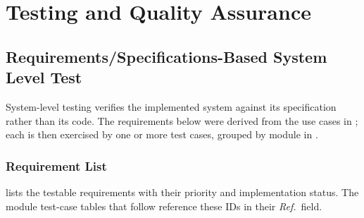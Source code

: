\chapter{Testing and Quality Assurance}\label{ch:test}

\section{Requirements/Specifications-Based System Level Test}

System-level testing verifies the implemented system against its
specification rather than its code.  The requirements below were derived from
the use cases in ; each is then exercised by one or more test
cases, grouped by module in .

\subsection{Requirement List}

 lists the testable requirements with their priority and
implementation status.  The module test-case tables that follow reference
these IDs in their \textit{Ref.}\ field.

